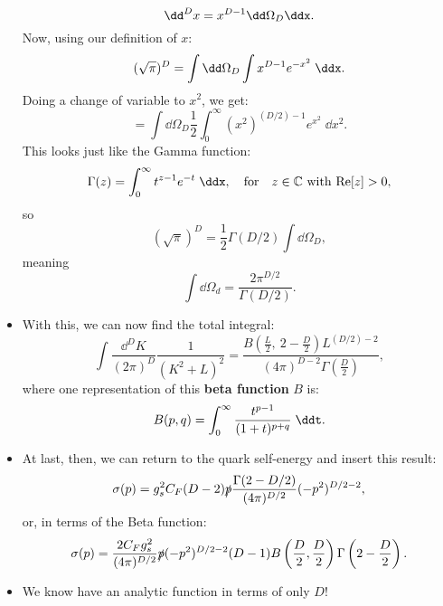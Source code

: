 \begin{itemize}
\begin{equation*}
            \dd^Dx = x^{D-1} \dd\Omega_D \ddx.
        \end{equation*}
        Now, using our definition of $x$:
        \begin{equation*}
            (\sqrt{\pi})^D = \int \dd\Omega_D \int x^{D-1}e^{-x^2}\;\ddx.
        \end{equation*}
        Doing a change of variable to $x^2$, we get:
        \begin{equation*}
            = \int \dd\Omega_D \frac{1}{2}\int_0^{\infty} (x^2)^{(D/2)-1} e^{x^2} \;\dd x^2.
        \end{equation*}
        This looks just like the Gamma function:
        \begin{equation*}
            \Gamma(z) = \int_0^{\infty} t^{z-1}e^{-t} \;\ddx, \quad \mathrm{for} \quad z\in\mathbb{C} \ \mathrm{with}\ \mathrm{Re}[z] > 0,
        \end{equation*}
        so
        \begin{equation*}
            (\sqrt{\pi})^D = \frac{1}{2}\Gamma(D/2) \int \dd\Omega_D,
        \end{equation*}
        meaning
        \begin{equation*}
            \boxed{\int\dd\Omega_d = \frac{2\pi^{D/2}}{\Gamma(D/2)}.}
        \end{equation*}

    \item With this, we can now find the total integral:
        \begin{equation*}
            \int \frac{\dd^DK}{(2\pi)^D} \frac{1}{(K^2 + L)^2} = \frac{B\left( \frac{L}{2},\ 2-\frac{D}{2} \right) L^{(D/2)-2}}{(4\pi)^{D-2}\Gamma\left( \frac{D}{2} \right)},
        \end{equation*}
        where one representation of this \textbf{beta function} $B$ is:
        \begin{equation*}
            B(p,q) = \int_0^{\infty} \frac{t^{p-1}}{(1+t)^{p+q}} \;\ddt.
        \end{equation*}
    \item At last, then, we can return to the quark self-energy and insert this result:
        \begin{equation*}
            \sigma(p) = g_s^2 C_F (D-2) \slashed{p} \frac{\Gamma(2- D/2)}{(4\pi)^{D/2}} (-p^2)^{D/2-2},
        \end{equation*}
        or, in terms of the Beta function: 
        \begin{equation*}
            \sigma(p) = \frac{2C_Fg_s^2}{(4\pi)^{D/2}}\slashed{p}(-p^2)^{D/2-2} (D-1) B\left( \frac{D}{2}, \frac{D}{2} \right) \Gamma\left( 2-\frac{D}{2} \right).
        \end{equation*}
    \item We know have an analytic function in terms of only $D$!
\end{itemize}